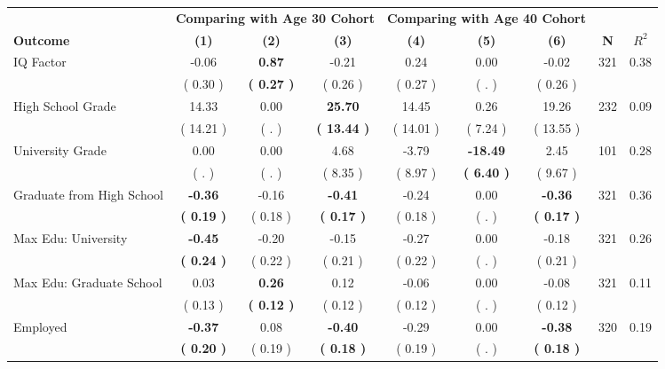 \begin{tabular}{lcccccccc}
\toprule
 & \multicolumn{3}{c}{\textbf{Comparing with Age 30 Cohort}} & \multicolumn{3}{c}{\textbf{Comparing with Age 40 Cohort}} & \\
\cmidrule(lr){2-4} \cmidrule(lr){5-7} 
 \textbf{Outcome} & \textbf{(1)} & \textbf{(2)} & \textbf{(3)} & \textbf{(4)} & \textbf{(5)} & \textbf{(6)} & \textbf{N} & \textbf{$ R^2$} \\
\midrule
IQ Factor &     -0.06 & \textbf{     0.87} &     -0.21 &      0.24 &      0.00 &     -0.02 & 321 &       0.38 \\ 
 & (     0.30 ) & \textbf{(     0.27 )} & (     0.26 ) & (     0.27 ) & (        . ) & (     0.26 ) & \\
High School Grade &     14.33 &      0.00 & \textbf{    25.70} &     14.45 &      0.26 &     19.26 & 232 &       0.09 \\ 
 & (    14.21 ) & (        . ) & \textbf{(    13.44 )} & (    14.01 ) & (     7.24 ) & (    13.55 ) & \\
University Grade &      0.00 &      0.00 &      4.68 &     -3.79 & \textbf{   -18.49} &      2.45 & 101 &       0.28 \\ 
 & (        . ) & (        . ) & (     8.35 ) & (     8.97 ) & \textbf{(     6.40 )} & (     9.67 ) & \\
Graduate from High School & \textbf{    -0.36} &     -0.16 & \textbf{    -0.41} &     -0.24 &      0.00 & \textbf{    -0.36} & 321 &       0.36 \\ 
 & \textbf{(     0.19 )} & (     0.18 ) & \textbf{(     0.17 )} & (     0.18 ) & (        . ) & \textbf{(     0.17 )} & \\
Max Edu: University & \textbf{    -0.45} &     -0.20 &     -0.15 &     -0.27 &      0.00 &     -0.18 & 321 &       0.26 \\ 
 & \textbf{(     0.24 )} & (     0.22 ) & (     0.21 ) & (     0.22 ) & (        . ) & (     0.21 ) & \\
Max Edu: Graduate School &      0.03 & \textbf{     0.26} &      0.12 &     -0.06 &      0.00 &     -0.08 & 321 &       0.11 \\ 
 & (     0.13 ) & \textbf{(     0.12 )} & (     0.12 ) & (     0.12 ) & (        . ) & (     0.12 ) & \\
Employed & \textbf{    -0.37} &      0.08 & \textbf{    -0.40} &     -0.29 &      0.00 & \textbf{    -0.38} & 320 &       0.19 \\ 
 & \textbf{(     0.20 )} & (     0.19 ) & \textbf{(     0.18 )} & (     0.19 ) & (        . ) & \textbf{(     0.18 )} & \\

\end{tabular}
